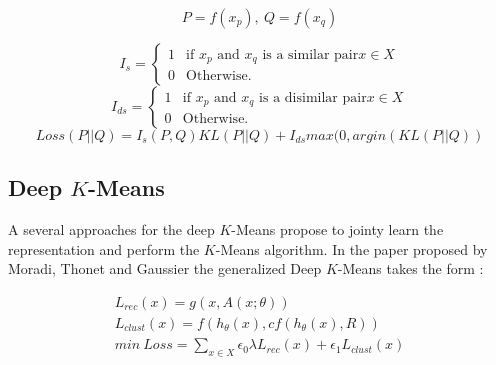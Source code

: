 \begin{equation*}
  P = f(x_p), ~ Q = f(x_q)
\end{equation*}

\begin{equation*}
  I_s = \left\{
\begin{array}{ll}
  1 & \mbox{if $x_p$ and $x_q$ is a similar pair} x \in X\\
  0 & \mbox{Otherwise.}
\end{array}
\right.
\end{equation*}
%
\begin{equation*}
  I_{ds} = \left\{
\begin{array}{ll}
  1 & \mbox{if $x_p$ and $x_q$ is a disimilar pair} x \in X\\
  0 & \mbox{Otherwise.}
\end{array}
\right.
\end{equation*}
\begin{equation*}
  Loss(P || Q) = I_s(P,Q)KL(P || Q) + I_{ds}max(0, argin(KL(P || Q))
\end{equation*}
\subsection{Deep $K$-Means}
A several approaches for the deep $K$-Means propose to jointy learn the
representation and perform the $K$-Means algorithm. 
In the paper proposed by Moradi, Thonet and Gaussier \cite{Deap-K-Means} the
generalized Deep $K$-Means takes the form :

\begin{gather*}
  L_{rec}(x) = g(x, A(x; \theta)) \\
  L_{clust}(x) = f(h_\theta(x), cf(h_\theta(x), R))\\
  min~Loss = \sum_{x \in X} \epsilon_0\lambda L_{rec}(x) + \epsilon_1 L_{clust}
  (x)
\end{gather*}
